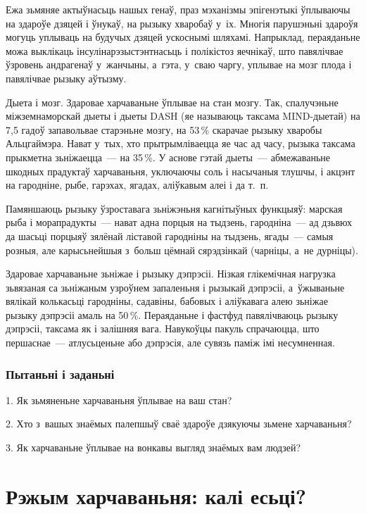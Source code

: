 Ежа зьмяняе актыўнасьць нашых генаў, праз мэханізмы эпігенэтыкі ўплываючы на здароўе дзяцей і ўнукаў, на рызыку хваробаў у~іх. Многія парушэньні здароўя могуць уплываць на будучых дзяцей ускоснымі шляхамі. Напрыклад, пераяданьне можа выклікаць інсулінарэзыстэнтнасьць і полікістоз яечнікаў, што павялічвае ўзровень андрагенаў у~жанчыны, а~гэта, у~сваю чаргу, уплывае на мозг плода і павялічвае рызыку аўтызму.

Дыета і мозг. Здаровае харчаваньне ўплывае на стан мозгу. Так, спалучэньне міжземнаморскай дыеты і дыеты DASH (яе называюць таксама MIND-дыетай) на 7,5 гадоў запавольвае старэньне мозгу, на 53\,\% скарачае рызыку хваробы Альцгаймэра. Нават у~тых, хто прытрымліваецца яе час ад часу, рызыка таксама прыкметна зьніжаецца~--- на 35\,\%. У аснове гэтай дыеты~--- абмежаваньне шкодных прадуктаў харчаваньня, уключаючы соль і насычаныя тлушчы, і акцэнт на гародніне, рыбе, гарэхах, ягадах, аліўкавым алеі і да т.~п.

Памяншаюць рызыку ўзроставага зьніжэньня кагнітыўных функцыяў: марская рыба і морапрадукты~--- нават адна порцыя на тыдзень, гародніна~--- ад дзьвюх да шасьці порцыяў зялёнай ліставой гародніны на тыдзень, ягады~--- самыя розныя, але карысьнейшыя з~больш цёмнай сярэдзінкай (чарніцы, а~не дурніцы).

Здаровае харчаваньне зьніжае і рызыку дэпрэсіі. Нізкая глікемічная нагрузка зьвязаная са зьніжаным узроўнем запаленьня і рызыкай дэпрэсіі, а~ўжываньне вялікай колькасьці гародніны, садавіны, бабовых і аліўкавага алею зьніжае рызыку дэпрэсіі амаль на 50\,\%. Пераяданьне і фастфуд павялічваюць рызыку дэпрэсіі, таксама як і залішняя вага. Навукоўцы пакуль спрачаюцца, што першаснае~--- атлусьценьне або дэпрэсія, але сувязь паміж імі несумненная.

\subsubsection{Пытаньні і заданьні}

1. Як зьмяненьне харчаваньня ўплывае на ваш стан?

2. Хто з~вашых знаёмых палепшыў сваё здароўе дзякуючы зьмене харчаваньня?

3. Як харчаваньне ўплывае на вонкавы выгляд знаёмых вам людзей?


\section{Рэжым харчаваньня: калі есьці?}

